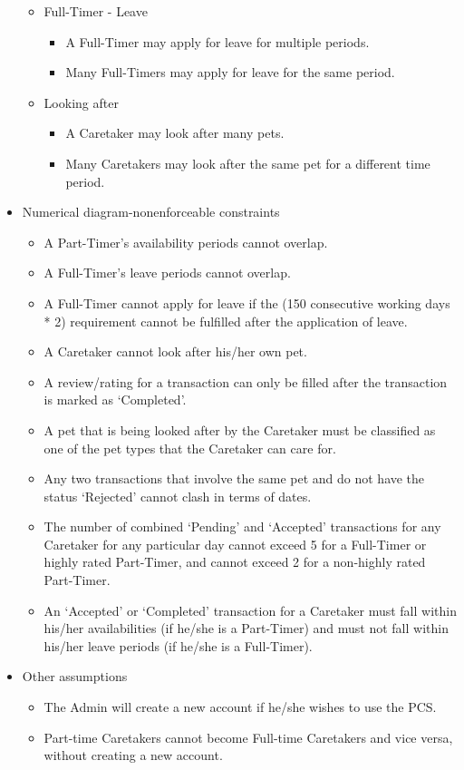 \documentclass[10pt]{article}
\begin{document}
\begin{itemize}
\begin{itemize}
        \item Full-Timer - Leave
        \begin{itemize}
            \item A Full-Timer may apply for leave for multiple periods.
            \item Many Full-Timers may apply for leave for the same period.
	    \end{itemize}
        \item Looking after
        \begin{itemize}
            \item A Caretaker may look after many pets.
            \item Many Caretakers may look after the same pet for a different time period.
        \end{itemize}
    \end{itemize}
    
    \item Numerical diagram-nonenforceable constraints
    \begin{itemize}
        \item A Part-Timer's availability periods cannot overlap.
        \item A Full-Timer's leave periods cannot overlap.
        \item A Full-Timer cannot apply for leave if the (150 consecutive working days * 2) requirement cannot be fulfilled after the application of leave.
        \item A Caretaker cannot look after his/her own pet.
        \item A review/rating for a transaction can only be filled after the transaction is marked as `Completed'.
        \item A pet that is being looked after by the Caretaker must be classified as one of the pet types that the Caretaker can care for.
        \item Any two transactions that involve the same pet and do not have the status `Rejected' cannot clash in terms of dates.
        \item The number of combined `Pending' and `Accepted' transactions for any Caretaker for any particular day cannot exceed 5 for a Full-Timer or highly rated Part-Timer, and cannot exceed 2 for a non-highly rated Part-Timer.
        \item An `Accepted' or `Completed' transaction for a Caretaker must fall within his/her availabilities (if he/she is a Part-Timer) and must not fall within his/her leave periods (if he/she is a Full-Timer).
    \end{itemize}
    
    \item Other assumptions
    \begin{itemize}
        \item The Admin will create a new account if he/she wishes to use the PCS.
        \item Part-time Caretakers cannot become Full-time Caretakers and vice versa, without creating a new account.
    \end{itemize}
\end{itemize} %
\end{document}
